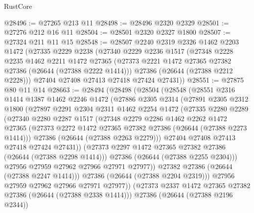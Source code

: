 \begin{lexlean}{RustCore}
\begin{coremodule}
@28496 := @27265 @213 @11
@28498 := @28496 @2320 @2329
@28501 := @27276 @212 @16 @11
@28504 := @28501 @2320 @2327 @1800
@28507 := @27324 @211 @11 @15
@28548 := @28507
    @2240
    @2319
    @2326
    @1462
    @2203
    @1472
    (@27335
      @2229
      @2238
      (@27340
        @2229
        @2236
        @1517
        (@27348
          @2228
          @2235
          @1462
          @2211
          @1472
          @27365
          (@27373 @2221 @1472 @27365 @27382 @27386 (@26644 (@27388 @2222 @1414)))
          @27386
          (@26644 (@27388 @2212 @2228)))
        @27404
        @27408
        @27413
        @27418
        @27424
        @27431))
@28551 := @27875 @80 @11 @14
@28663 := @28494
    (@28498
      (@28504
        (@28548
          (@28551
            @2316
            @1414
            @1387
            @1462
            @2246
            @1472
            (@27886
              @2305
              @2314
              (@27891
                @2305
                @2312
                @1800
                (@27897
                  @2291
                  @2304
                  @2311
                  @1462
                  @2254
                  @1472
                  (@27335
                    @2280
                    @2289
                    (@27340
                      @2280
                      @2287
                      @1517
                      (@27348
                        @2279
                        @2286
                        @1462
                        @2262
                        @1472
                        @27365
                        (@27373 @2272 @1472 @27365 @27382 @27386 (@26644 (@27388 @2273 @1414)))
                        @27386
                        (@26644 (@27388 @2263 @2279)))
                      @27404
                      @27408
                      @27413
                      @27418
                      @27424
                      @27431))
                  (@27373 @2297 @1472 @27365 @27382 @27386 (@26644 (@27388 @2298 @1414)))
                  @27386
                  (@26644 (@27388 @2255 @2304)))
                @27956
                @27959
                @27962
                @27966
                @27971
                @27977))
            @27382
            @27386
            (@26644 (@27388 @2247 @1414)))
          @27386
          (@26644 (@27388 @2204 @2319)))
        @27956
        @27959
        @27962
        @27966
        @27971
        @27977))
    (@27373 @2337 @1472 @27365 @27382 @27386 (@26644 (@27388 @2338 @1414)))
    @27386
    (@26644 (@27388 @2196 @2344))

\end{coremodule}
\end{lexlean}
